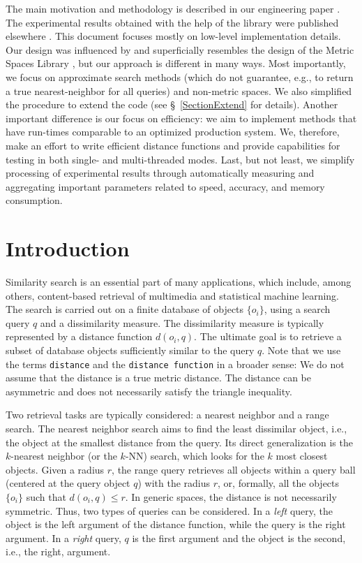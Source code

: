 \documentclass[runningheads,a4paper]{llncs}
\newcommand{\ttt}[1]{\texttt{#1}}
\newcommand{\knn}{$k$-NN}
\begin{document}
{The main motivation and methodology is described in our engineering paper \cite{Boytsov_and_Bilegsaikhan:sisap2013}.
The experimental results obtained with the help of the library
were published elsewhere \cite{Boytsov_and_Bilegsaikhan:nips2013}.
This document focuses mostly on low-level implementation details. 
Our design was influenced by and superficially resembles the design of the Metric Spaces Library \cite{LibMetricSpace},
but our approach is different in many ways. 
Most importantly, we focus on approximate search methods (which do not guarantee, e.g.,
to return a true nearest-neighbor for all queries) and non-metric spaces.
We also simplified the procedure to extend the code (see \S~\ref{SectionExtend} for details).
Another important difference is our focus on efficiency:
we aim to implement methods that have run-times comparable to an optimized production system. 
We, therefore, make an effort to write efficient distance functions
and provide capabilities for testing in both single- and multi-threaded modes.
Last, but not least, we simplify processing of experimental results
through automatically measuring and aggregating important parameters
related to speed, accuracy, and memory consumption.


\section{Introduction}
Similarity search is an essential part of many applications,
which include, among others,  
content-based retrieval of multimedia  and statistical machine learning.
The search is carried out on a finite database of objects $\{o_i\}$,
using a search query $q$ and a dissimilarity measure.
The dissimilarity measure is typically represented by a distance function $d(o_i, q)$. 
The ultimate goal is to retrieve a subset of database objects sufficiently similar to the query $q$.
Note that we use the terms \ttt{distance} and the \ttt{distance function} in a broader sense:
We do not assume that the distance is a true metric distance. 
The distance can be asymmetric and does not necessarily satisfy the triangle inequality.

Two retrieval tasks are typically considered: a nearest neighbor and a range search. 
The nearest neighbor search aims to find the least dissimilar object,
i.e., the object at the smallest distance from the query.
Its direct generalization is the $k$-nearest neighbor (or the \knn) search,
which looks for the $k$ most closest objects.
Given a radius $r$, 
the range query retrieves all objects within a query ball (centered at the query object $q$) with the radius $r$,
or, formally, all the objects~$\lbrace o_i \rbrace$ such that $d(o_i, q) \le r$. 
In generic spaces, the distance is not necessarily symmetric. 
Thus, two types of queries can be considered. 
In a  \emph{left} query, the object is the left argument of the distance function,
while the query is the right argument.
In a \emph{right} query, $q$ is the first argument and the object is the second, i.e.,
the right, argument.

}
\end{document}
